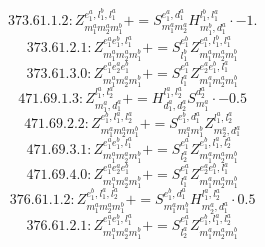 \documentclass[letterpaper,10pt,fleqn,leqno,onecolumn]{article}
\begin{document}
\begin{equation} \;\;\;\;\;\;  373.61.1.2: Z^{e_{1}^{a},l_{1}^{b},l_{1}^{a}}_{m_{1}^{a}m_{2}^{a}m_{1}^{b}}+=S^{e_{1}^{a},d_{1}^{a}}_{m_{1}^{a}m_{2}^{a}}H^{l_{1}^{b},l_{1}^{a}}_{m_{1}^{b},d_{1}^{a}}\cdot -1. \end{equation}
\begin{equation} \;\;\;\;\;\;  373.61.2.1: Z^{e_{1}^{a}e_{1}^{b},l_{1}^{a}}_{m_{1}^{a}m_{2}^{a}m_{1}^{b}}+=S^{e_{1}^{b}}_{l_{1}^{b}}Z^{e_{1}^{a},l_{1}^{b},l_{1}^{a}}_{m_{1}^{a}m_{2}^{a}m_{1}^{b}} \end{equation}
\begin{equation} \;\;\;\;\;\;  373.61.3.0: Z^{e_{1}^{a}e_{2}^{a}e_{1}^{b}}_{m_{1}^{a}m_{2}^{a}m_{1}^{b}}+=S^{e_{1}^{a}}_{l_{1}^{a}}Z^{e_{2}^{a}e_{1}^{b},l_{1}^{a}}_{m_{1}^{a}m_{2}^{a}m_{1}^{b}} \end{equation}
\begin{equation} \;\;\;\;\;\;  471.69.1.3: Z^{l_{1}^{a},l_{2}^{a}}_{m_{1}^{a},d_{1}^{a}}+=H^{l_{1}^{a},l_{2}^{a}}_{d_{1}^{a},d_{2}^{a}}S^{d_{2}^{a}}_{m_{1}^{a}}\cdot -0.5 \end{equation}
\begin{equation} \;\;\;\;\;\;  471.69.2.2: Z^{e_{1}^{b},l_{1}^{a},l_{2}^{a}}_{m_{1}^{a}m_{2}^{a}m_{1}^{b}}+=S^{e_{1}^{b},d_{1}^{a}}_{m_{1}^{a}m_{1}^{b}}Z^{l_{1}^{a},l_{2}^{a}}_{m_{2}^{a},d_{1}^{a}} \end{equation}
\begin{equation} \;\;\;\;\;\;  471.69.3.1: Z^{e_{1}^{a}e_{1}^{b},l_{1}^{a}}_{m_{1}^{a}m_{2}^{a}m_{1}^{b}}+=S^{e_{1}^{a}}_{l_{2}^{a}}Z^{e_{1}^{b},l_{1}^{a},l_{2}^{a}}_{m_{1}^{a}m_{2}^{a}m_{1}^{b}} \end{equation}
\begin{equation} \;\;\;\;\;\;  471.69.4.0: Z^{e_{1}^{a}e_{2}^{a}e_{1}^{b}}_{m_{1}^{a}m_{2}^{a}m_{1}^{b}}+=S^{e_{1}^{a}}_{l_{1}^{a}}Z^{e_{2}^{a}e_{1}^{b},l_{1}^{a}}_{m_{1}^{a}m_{2}^{a}m_{1}^{b}} \end{equation}
\begin{equation} \;\;\;\;\;\;  376.61.1.2: Z^{e_{1}^{b},l_{1}^{a},l_{2}^{a}}_{m_{1}^{a}m_{2}^{a}m_{1}^{b}}+=S^{e_{1}^{b},d_{1}^{a}}_{m_{1}^{a}m_{1}^{b}}H^{l_{1}^{a},l_{2}^{a}}_{m_{2}^{a},d_{1}^{a}}\cdot 0.5 \end{equation}
\begin{equation} \;\;\;\;\;\;  376.61.2.1: Z^{e_{1}^{a}e_{1}^{b},l_{1}^{a}}_{m_{1}^{a}m_{2}^{a}m_{1}^{b}}+=S^{e_{1}^{a}}_{l_{2}^{a}}Z^{e_{1}^{b},l_{1}^{a},l_{2}^{a}}_{m_{1}^{a}m_{2}^{a}m_{1}^{b}} \end{equation}
\end{document}
